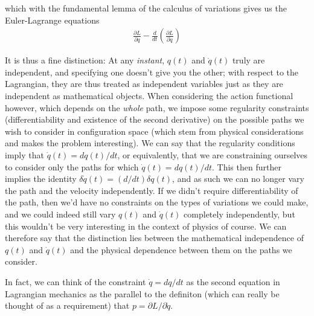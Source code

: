 \documentclass[a4paper]{article}
\begin{document}
    which with the fundamental lemma of the calculus of variations gives us the Euler-Lagrange equations
    \begin{align*}
        \frac{\partial L}{\partial q} - \frac{d}{dt} \left(  \frac{\partial L}{\partial \dot{q} } \right)
    \end{align*}

    It is thus a fine distinction: At any \textit{instant}, \(q(t)\) and \(\dot{q}(t)\) truly are independent, and specifying one doesn't give you the other; with respect to the Lagrangian, they are thus treated as independent variables just as they are independent as mathematical objects. When considering the action functional however, which depends on the \textit{whole} path, we impose some regularity constraints (differentiability and existence of the second derivative) on the possible paths we wish to consider in configuration space (which stem from physical considerations and makes the problem interesting). We can say that the regularity conditions imply that \(\dot{q}(t) = dq(t) / dt\), or equivalently, that we are constraining ourselves to consider only the paths for which \(\dot{q} (t) = dq(t) / dt\). This then further implies the identity \(\delta \dot{q} (t) = (d / dt)\delta q(t)\), and as such we can no longer vary the path and the velocity independently. If we didn't require differentiability of the path, then we'd have no constraints on the types of variations we could make, and we could indeed still vary \(q(t)\) and \(\dot{q} (t)\) completely independently, but this wouldn't be very interesting in the context of physics of course. We can therefore say that the distinction lies between the mathematical independence of \(q(t)\) and \(\dot{q} (t)\) and the physical dependence between them on the paths we consider.   

    In fact, we can think of the constraint \(\dot{q} = dq/ dt\) as the second equation in Lagrangian mechanics as the parallel to the definiton (which can really be thought of as a requirement) that \(p = \partial L / \partial \dot{q}\).
\end{document}
